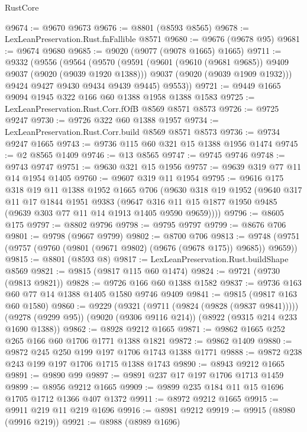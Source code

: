 \begin{lexlean}{RustCore}
\begin{coremodule}
@9674 := @9670 @9673
@9676 := @8801 (@8593 @8565)
@9678 := LexLeanPreservation.Rust.fnFallible @8571
@9680 := @9676 (@9678 @95)
@9681 := @9674 @9680
@9685 := @9020 (@9077 (@9078 @1665) @1665)
@9711 := @9332
    (@9556
      (@9564
        (@9570
          (@9591
            (@9601 (@9610 (@9681 @9685)) @9409 @9037 (@9020 (@9039 @1920 @1388)))
            @9037
            (@9020 (@9039 @1909 @1932)))
          @9424
          @9427
          @9430
          @9434
          @9439
          @9445)
        @9553))
@9721 := @9449 @1665 @9094 @1945 @322 @166 @60 @1388 @1958 @1388 @1583
@9725 := LexLeanPreservation.Rust.Corr.fOfB @8569 @8571 @8573
@9726 := @9725 @9247
@9730 := @9726 @322 @60 @1388 @1957
@9734 := LexLeanPreservation.Rust.Corr.build @8569 @8571 @8573
@9736 := @9734 @9247 @1665
@9743 := @9736 @115 @60 @321 @15 @1388 @1956 @1474
@9745 := @2 @8565 @1409
@9746 := @13 @8565
@9747 := @9745 @9746
@9748 := @9743 @9747
@9751 := @9630 @321 @15 @1956
@9757 := @9639 @319 @77 @11 @14 @1954 @1405
@9760 := @9607 @319 @11 @1954
@9795 := @9616
    @175
    @318
    @19
    @11
    @1388
    @1952
    @1665
    @706
    (@9630
      @318
      @19
      @1952
      (@9640
        @317
        @11
        @17
        @1844
        @1951
        @9383
        (@9647 @316 @11 @15 @1877 @1950 @9485 (@9639 @303 @77 @11 @14 @1913 @1405 @9590 @9659))))
@9796 := @8605 @175
@9797 := @8802 @9796
@9798 := @9795 @9797
@9799 := @8676 @706
@9801 := @9798 (@9667 @9799)
@9802 := @8700 @706
@9813 := @9748 (@9751 (@9757 (@9760 (@9801 (@9671 @9802) (@9676 (@9678 @175)) @9685)) @9659))
@9815 := @8801 (@8593 @8)
@9817 := LexLeanPreservation.Rust.buildShape @8569
@9821 := @9815 (@9817 @115 @60 @1474)
@9824 := @9721 (@9730 (@9813 @9821))
@9828 := @9726 @166 @60 @1388 @1582
@9837 := @9736 @163 @60 @77 @14 @1388 @1405 @1580 @9746 @9409
@9841 := @9815 (@9817 @163 @60 @1580)
@9860 := @9229
    (@9321 (@9711 (@9824 (@9828 (@9837 @9841)))))
    (@9278 (@9299 @95))
    (@9020 (@9306 @9116 @214))
    (@8922 (@9315 @214 @233 @1690 @1388))
@9862 := @8928 @9212 @1665
@9871 := @9862 @1665 @252 @265 @166 @60 @1706 @1771 @1388 @1821
@9872 := @9862 @1409
@9880 := @9872 @245 @250 @199 @197 @1706 @1743 @1388 @1771
@9888 := @9872 @238 @243 @199 @197 @1706 @1715 @1388 @1743
@9890 := @8943 @9212 @1665
@9891 := @9890 @99
@9897 := @9891 @237 @17 @197 @1706 @1713 @1459
@9899 := @8956 @9212 @1665
@9909 := @9899 @235 @184 @11 @15 @1696 @1705 @1712 @1366 @407 @1372
@9911 := @8972 @9212 @1665
@9915 := @9911 @219 @11 @219 @1696
@9916 := @8981 @9212
@9919 := @9915 (@8980 (@9916 @219))
@9921 := @8988 (@8989 @1696)

\end{coremodule}
\end{lexlean}
